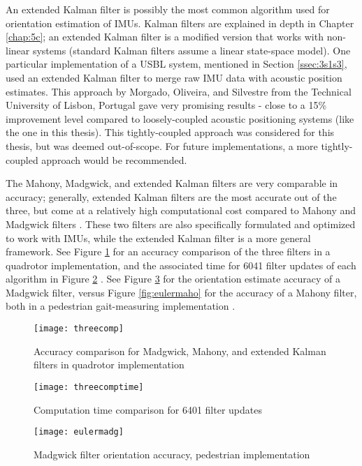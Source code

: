 \documentclass[12pt,a4paper]{report}
\begin{document}
An extended Kalman filter is possibly the most common algorithm used for orientation estimation of IMUs. Kalman filters are explained in depth in Chapter \ref{chap:5c}; an extended Kalman filter is a modified version that works with non-linear systems (standard Kalman filters assume a linear state-space model). One particular implementation of a USBL system, mentioned in Section \ref{ssec:3s1s3}, used an extended Kalman filter to merge raw IMU data with acoustic position estimates. This approach by Morgado, Oliveira, and Silvestre from the Technical University of Lisbon, Portugal gave very promising results - close to a 15\% improvement level compared to loosely-coupled acoustic positioning systems \cite{tightekf} (like the one in this thesis). This tightly-coupled approach was considered for this thesis, but was deemed out-of-scope. For future implementations, a more tightly-coupled approach would be recommended.

The Mahony, Madgwick, and extended Kalman filters are very comparable in accuracy; generally, extended Kalman filters are the most accurate out of the three, but come at a relatively high computational cost compared to Mahony and Madgwick filters \cite{madgwick} \cite{sfcomp}. These two filters are also specifically formulated and optimized to work with IMUs, while the extended Kalman filter is a more general framework. See Figure \ref{fig:threecomp} for an accuracy comparison of the three filters in a quadrotor implementation, and the associated time for 6041 filter updates of each algorithm in Figure \ref{fig:threecomptime} \cite{ekfmadmah}. See Figure \ref{fig:eulermadg} for the orientation estimate accuracy of a Madgwick filter, versus Figure \ref{fig:eulermaho} for the accuracy of a Mahony filter, both in a pedestrian gait-measuring implementation \cite{sfcomp}.

\begin{figure}[htbp]
	\centering
	\texttt{[image: threecomp]}
	\caption{Accuracy comparison for Madgwick, Mahony, and extended Kalman filters in quadrotor implementation \cite{ekfmadmah}}
	\label{fig:threecomp}
\end{figure}

\begin{figure}[htbp]
	\centering
	\texttt{[image: threecomptime]}
	\caption{Computation time comparison for 6401 filter updates \cite{ekfmadmah}}
	\label{fig:threecomptime}
\end{figure}

\begin{figure}[htbp]
	\centering
	\texttt{[image: eulermadg]}
	\caption{Madgwick filter orientation accuracy, pedestrian implementation \cite{sfcomp}}
	\label{fig:eulermadg}
\end{figure}
\end{document}
